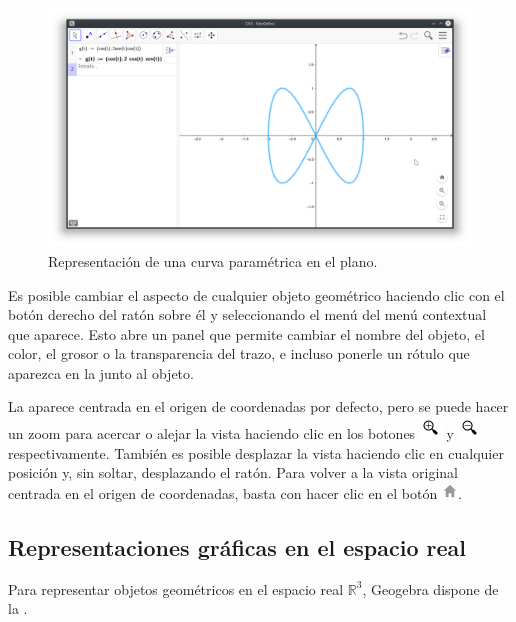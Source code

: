 \begin{figure}[h!]
\begin{center}
\includegraphics[width=\textwidth]{img/introduccion/parametric-curve}
\caption{Representación de una curva paramétrica en el plano.} \label{g:curva-parametrica}
\end{center}
\end{figure}

Es posible cambiar el aspecto de cualquier objeto geométrico haciendo clic con el botón derecho del ratón sobre él y seleccionando el menú  del menú contextual que aparece.
Esto abre un panel que permite cambiar el nombre del objeto, el color, el grosor o la transparencia del trazo, e incluso ponerle un rótulo que aparezca en la  junto al objeto.

La  aparece centrada en el origen de coordenadas por defecto, pero se puede hacer un zoom para acercar o alejar la vista haciendo clic en los botones \includegraphics[scale=0.03]{img/introduccion/zoom-in-button} y \includegraphics[scale=0.03]{img/introduccion/zoom-out-button} respectivamente.
También es posible desplazar la vista haciendo clic en cualquier posición y, sin soltar, desplazando el ratón.
Para volver a la vista original centrada en el origen de coordenadas, basta con hacer clic en el botón \includegraphics[scale=0.03]{img/introduccion/home-button}.


\subsection*{Representaciones gráficas en el espacio real}
Para representar objetos geométricos en el espacio real $\mathbb{R}^3$, Geogebra dispone de la .

